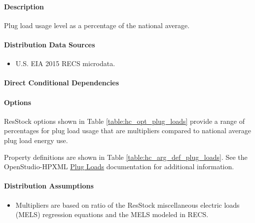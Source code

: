 \paragraph{Description}
% 
Plug load usage level as a percentage of the national average.  

\paragraph{Distribution Data Sources}
% 
\begin{itemize}
 
\item
  U.S. EIA 2015 RECS microdata.
\end{itemize}

\paragraph{Direct Conditional Dependencies}


\paragraph{Options}
ResStock options shown in Table \ref{table:hc_opt_plug_loads} provide a range of percentages for plug load usage that are multipliers compared to national average plug load energy use.



Property definitions are shown in Table \ref{table:hc_arg_def_plug_loads}. See the OpenStudio-HPXML \href{https://openstudio-hpxml.readthedocs.io/en/v1.10.0/workflow_inputs.html#hpxml-plug-loads}{Plug Loads} documentation for additional information.



\paragraph{Distribution Assumptions}
% 
\begin{itemize}
 
\item
  Multipliers are based on ratio of the ResStock miscellaneous electric loads (MELS) regression equations and the MELS modeled in RECS.
\end{itemize}
